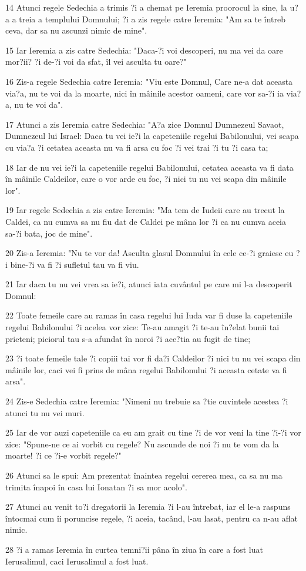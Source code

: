 \par 14 Atunci regele Sedechia a trimis ?i a chemat pe Ieremia proorocul la sine, la u?a a treia a templului Domnului; ?i a zis regele catre Ieremia: "Am sa te întreb ceva, dar sa nu ascunzi nimic de mine".
\par 15 Iar Ieremia a zis catre Sedechia: "Daca-?i voi descoperi, nu ma vei da oare mor?ii? ?i de-?i voi da sfat, îl vei asculta tu oare?"
\par 16 Zis-a regele Sedechia catre Ieremia: "Viu este Domnul, Care ne-a dat aceasta via?a, nu te voi da la moarte, nici în mâinile acestor oameni, care vor sa-?i ia via?a, nu te voi da".
\par 17 Atunci a zis Ieremia catre Sedechia: "A?a zice Domnul Dumnezeul Savaot, Dumnezeul lui Israel: Daca tu vei ie?i la capeteniile regelui Babilonului, vei scapa cu via?a ?i cetatea aceasta nu va fi arsa cu foc ?i vei trai ?i tu ?i casa ta;
\par 18 Iar de nu vei ie?i la capeteniile regelui Babilonului, cetatea aceasta va fi data în mâinile Caldeilor, care o vor arde cu foc, ?i nici tu nu vei scapa din mâinile lor".
\par 19 Iar regele Sedechia a zis catre Ieremia: "Ma tem de Iudeii care au trecut la Caldei, ca nu cumva sa nu fiu dat de Caldei pe mâna lor ?i ca nu cumva aceia sa-?i bata, joc de mine".
\par 20 Zis-a Ieremia: "Nu te vor da! Asculta glasul Domnului în cele ce-?i graiesc eu ?i bine-?i va fi ?i sufletul tau va fi viu.
\par 21 Iar daca tu nu vei vrea sa ie?i, atunci iata cuvântul pe care mi l-a descoperit Domnul:
\par 22 Toate femeile care au ramas în casa regelui lui Iuda var fi duse la capeteniile regelui Babilonului ?i acelea vor zice: Te-au amagit ?i te-au în?elat bunii tai prieteni; piciorul tau s-a afundat în noroi ?i ace?tia au fugit de tine;
\par 23 ?i toate femeile tale ?i copiii tai vor fi da?i Caldeilor ?i nici tu nu vei scapa din mâinile lor, caci vei fi prins de mâna regelui Babilonului ?i aceasta cetate va fi arsa".
\par 24 Zis-e Sedechia catre Ieremia: "Nimeni nu trebuie sa ?tie cuvintele acestea ?i atunci tu nu vei muri.
\par 25 Iar de vor auzi capeteniile ca eu am grait cu tine ?i de vor veni la tine ?i-?i vor zice: "Spune-ne ce ai vorbit cu regele? Nu ascunde de noi ?i nu te vom da la moarte! ?i ce ?i-e vorbit regele?"
\par 26 Atunci sa le spui: Am prezentat înaintea regelui cererea mea, ca sa nu ma trimita înapoi în casa lui Ionatan ?i sa mor acolo".
\par 27 Atunci au venit to?i dregatorii la Ieremia ?i l-au întrebat, iar el le-a raspuns întocmai cum îi poruncise regele, ?i aceia, tacând, l-au lasat, pentru ca n-au aflat nimic.
\par 28 ?i a ramas Ieremia în curtea temni?ii pâna în ziua în care a fost luat Ierusalimul, caci Ierusalimul a fost luat.

